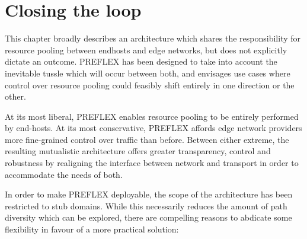 \section{Closing the loop}

This chapter broadly describes an architecture which shares the responsibility for resource pooling between endhosts and edge networks, but does not explicitly dictate an outcome. \ac{PREFLEX} has been designed to take into account the inevitable tussle which will occur between both, and envisages use cases where control over resource pooling could feasibly shift entirely in one direction or the other. 

At its most liberal, \ac{PREFLEX} enables resource pooling to be entirely performed by end-hosts. At its most conservative, \ac{PREFLEX} affords edge network providers more fine-grained control over traffic than before. Between either extreme, the resulting mutualistic architecture offers greater transparency, control and robustness by realigning the interface between network and transport in order to accommodate the needs of both.

In order to make \ac{PREFLEX} deployable, the scope of the architecture has been restricted to stub domains.
While this necessarily reduces the amount of path diversity which can be explored, there are compelling reasons to abdicate some flexibility in favour of a more practical solution:

